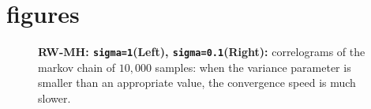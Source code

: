 \documentclass[12pt]{report}	%
\begin{document}
\section{ figures}


\begin{figure}[H]
        \centering
       \caption{\textbf{RW-MH: \texttt{sigma=1}(Left), \texttt{sigma=0.1}(Right):} correlograms of the markov chain of $10,000$ samples: when the variance parameter is smaller than an appropriate value, the convergence speed is much slower. }
\label{fig:1-reall23}
\end{figure} 
\end{document}
